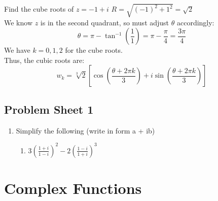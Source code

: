 \documentclass[a4paper, 10pt]{article}
\begin{document}
\begin{examplebox}{Find the cube roots of $z = -1 + i$}{}
  $R = \sqrt{(-1)^2 + 1^2} = \sqrt{2}$ \\
  We know $z$ is in the second quadrant, so must adjust $\theta$ accordingly:
  $$\theta = \pi - \tan^{-1}\left(\frac{1}{1}\right) = \pi - \frac{\pi}{4} = \frac{3\pi}{4}$$
  We have $k = 0,1,2$ for the cube roots. \\
  Thus, the cubic roots are:
  $$w_k = \sqrt[3]{2} \left[\cos\left(\frac{\theta + 2\pi k}{3}\right) + i\sin\left(\frac{\theta + 2\pi k}{3}\right)\right]$$
\end{examplebox}

\subsection{Problem Sheet 1}
\begin{enumerate}
  \item Simplify the following (write in form a + ib)
        \begin{enumerate}
          \item $3\left( \frac{1+ i}{1-i} \right)^2 - 2\left(\frac{1-i}{1+i}\right)^3$
        \end{enumerate}
\end{enumerate}

\pagebreak

\section{Complex Functions}
\end{document}
